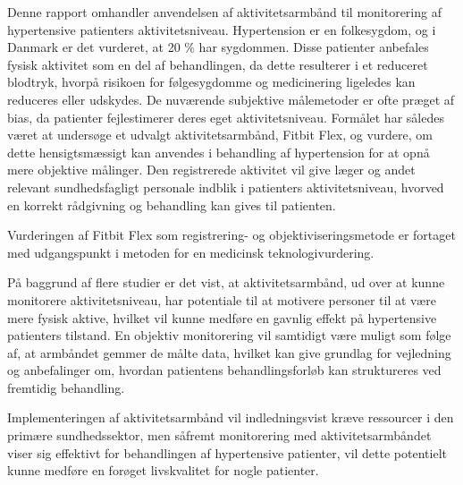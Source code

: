 Denne rapport omhandler anvendelsen af aktivitetsarmbånd til monitorering af hypertensive patienters aktivitetsniveau. 
Hypertension er en folkesygdom, og i Danmark er det vurderet, at 20 \% har sygdommen. Disse patienter anbefales fysisk aktivitet som en del af behandlingen, da dette resulterer i et reduceret blodtryk, hvorpå risikoen for følgesygdomme og medicinering ligeledes kan reduceres eller udskydes. 
De nuværende subjektive målemetoder er ofte præget af bias, da patienter fejlestimerer deres eget aktivitetsniveau. Formålet har således været at undersøge et udvalgt aktivitetsarmbånd, Fitbit Flex, og vurdere, om dette hensigtsmæssigt kan anvendes i behandling af hypertension for at opnå mere objektive målinger. 
Den registrerede aktivitet vil give læger og andet relevant sundhedsfagligt personale indblik i patienters aktivitetsniveau, hvorved en korrekt rådgivning og behandling kan gives til patienten. 

Vurderingen af Fitbit Flex som registrering- og objektiviseringsmetode er fortaget med udgangspunkt i metoden for en medicinsk teknologivurdering.  

På baggrund af flere studier er det vist, at aktivitetsarmbånd, ud over at kunne monitorere aktivitetsniveau, har potentiale til at motivere personer til at være mere fysisk aktive, hvilket vil kunne medføre en gavnlig effekt på hypertensive patienters tilstand. En objektiv monitorering vil samtidigt være muligt som følge af, at armbåndet gemmer de målte data, hvilket kan give grundlag for vejledning og anbefalinger om, hvordan patientens behandlingsforløb kan struktureres ved fremtidig behandling.

Implementeringen af aktivitetsarmbånd vil indledningsvist kræve ressourcer i den primære sundhedssektor, men såfremt monitorering med aktivitetsarmbåndet viser sig effektivt for behandlingen af hypertensive patienter, vil dette potentielt kunne medføre en forøget livskvalitet for nogle patienter. 